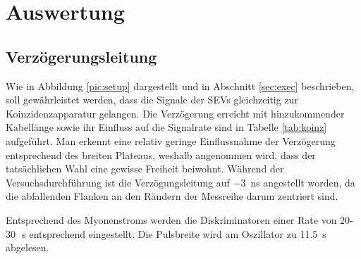 \label{sec:exec}

\section{Auswertung}
\subsection{Verzögerungsleitung}
Wie in Abbildung \ref{pic:setup} dargestellt und in Abschnitt \ref{sec:exec} beschrieben, soll gewährleistet werden, dass die Signale der SEVs 
gleichzeitig zur Koinzidenzapparatur gelangen. Die Verzögerung erreicht mit hinzukommender Kabellänge sowie ihr Einfluss auf die Signalrate
sind in Tabelle \ref{tab:koinz} aufgeführt. Man erkennt eine relativ geringe Einflussnahme der Verzögerung entsprechend des breiten Plateaus,
weshalb angenommen wird, dass der tatsächlichen Wahl eine gewisse Freiheit beiwohnt. 
Während der Versuchsdurchführung ist die Verzögungsleitung auf \SI{-3}{\nano\second} angestellt worden, da die abfallenden Flanken an den 
Rändern der Messreihe darum zentriert sind. 
\begin{table}[b]

\caption{Verzögerungsleitung zur Synchronisierung der SEVs. Negative $t$ entsprechen einer Verzögerung des linken SEVs. In der dritten Spalte 
sind die Zählraten auf 10\,s Messzeit aufgeführt.}
\label{tab:koinz}
\end{table}
Entsprechend des Myonenstroms \cite{pdg} werden die Diskriminatoren einer Rate von 20-30\,\si{\per\second} \cite{Anl} entsprechend eingestellt. Die 
Pulsbreite wird am Oszillator zu \SI{11,5}{\s} abgelesen.
